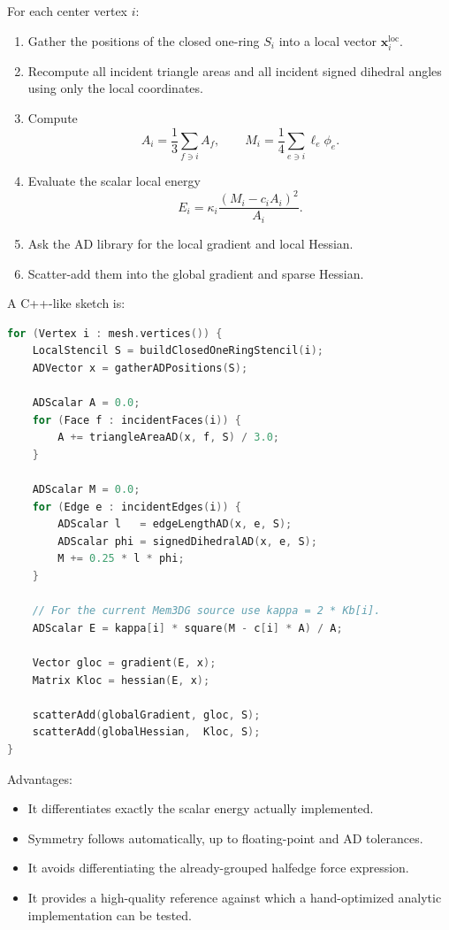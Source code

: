 \documentclass[11pt]{article}
\newcommand{\x}{\mathbf{x}}
\begin{document}
For each center vertex $i$:
\begin{enumerate}
  \item Gather the positions of the closed one-ring $S_i$ into a local vector $\x_i^{\mathrm{loc}}$.
  \item Recompute all incident triangle areas and all incident signed dihedral angles using only the local coordinates.
  \item Compute
  \begin{equation}
    A_i=\frac{1}{3}\sum_{f\ni i}A_f,
    \qquad
    M_i=\frac{1}{4}\sum_{e\ni i}\ell_e\phi_e.
  \end{equation}
  \item Evaluate the scalar local energy
  \begin{equation}
    E_i=\kappa_i\frac{(M_i-c_iA_i)^2}{A_i}.
  \end{equation}
  \item Ask the AD library for the local gradient and local Hessian.
  \item Scatter-add them into the global gradient and sparse Hessian.
\end{enumerate}

A C++-like sketch is:
\begin{lstlisting}[language=C++]
for (Vertex i : mesh.vertices()) {
    LocalStencil S = buildClosedOneRingStencil(i);
    ADVector x = gatherADPositions(S);

    ADScalar A = 0.0;
    for (Face f : incidentFaces(i)) {
        A += triangleAreaAD(x, f, S) / 3.0;
    }

    ADScalar M = 0.0;
    for (Edge e : incidentEdges(i)) {
        ADScalar l   = edgeLengthAD(x, e, S);
        ADScalar phi = signedDihedralAD(x, e, S);
        M += 0.25 * l * phi;
    }

    // For the current Mem3DG source use kappa = 2 * Kb[i].
    ADScalar E = kappa[i] * square(M - c[i] * A) / A;

    Vector gloc = gradient(E, x);
    Matrix Kloc = hessian(E, x);

    scatterAdd(globalGradient, gloc, S);
    scatterAdd(globalHessian,  Kloc, S);
}
\end{lstlisting}

Advantages:
\begin{itemize}
  \item It differentiates exactly the scalar energy actually implemented.
  \item Symmetry follows automatically, up to floating-point and AD tolerances.
  \item It avoids differentiating the already-grouped halfedge force expression.
  \item It provides a high-quality reference against which a hand-optimized analytic implementation can be tested.
\end{itemize}
\end{document}
